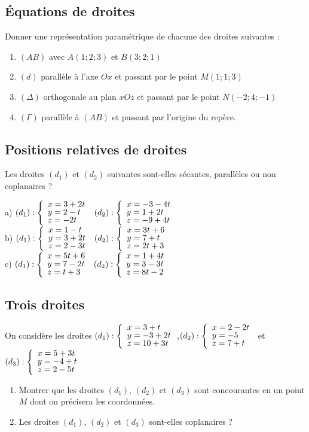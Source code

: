 \documentclass[oneside,12pt]{book}          %
\begin{document}
\subsection{Équations de droites}
Donner une représentation paramétrique de chacune des droites suivantes :
\begin{enumerate}
    \item $(AB)$ avec $A(1;2;3)$ et $B(3;2;1)$
    \item $(d)$ parallèle à l'axe $Ox$ et passant par le point $M(1;1;3)$
    \item $(\Delta)$ orthogonale au plan $xOz$ et passant par le point $N(-2;4;-1)$
    \item $(\Gamma)$ parallèle à $(AB)$ et passant par l'origine du repère.
\end{enumerate}



\subsection{Positions relatives de droites}
Les droites $(d_1)$ et $(d_2)$ suivantes sont-elles sécantes, parallèles ou non coplanaires ?

a) $(d_1):\accol{x=3+2t\\y=2-t\\z=-2t}$ \qquad $(d_2):\accol{x=-3-4t\\y=1+2t\\z=-9+4t}$ \\[15pt]
b) $(d_1):\accol{x=1-t\\y=3+2t\\z=2-3t}$ \qquad $(d_2):\accol{x=3t+6\\y=7+t\\z=2t+3}$ \\[15pt]
c) $(d_1):\accol{x=5t+6\\y=7-2t\\z=t+3}$ \qquad $(d_2):\accol{x=1+4t\\y=3-3t\\z=8t-2}$ \\[15pt]



\subsection{Trois droites}
On considère les droites $(d_1):\accol{x=3+t\\y=-3+2t\\z=10+3t}$,\quad$(d_2):\accol{x=2-2t\\y=-5\\z=7+t}$ et $(d_3):\accol{x=5+3t\\y=-4+t\\z=2-5t}$
\begin{enumerate}
	\item Montrer que les droites $(d_1)$, $(d_2)$ et $(d_3)$ sont concourantes en un point $M$ dont on précisera les coordonnées.
	\item Les droites $(d_1)$, $(d_2)$ et $(d_3)$ sont-elles coplanaires ?
\end{enumerate}
\end{document}
